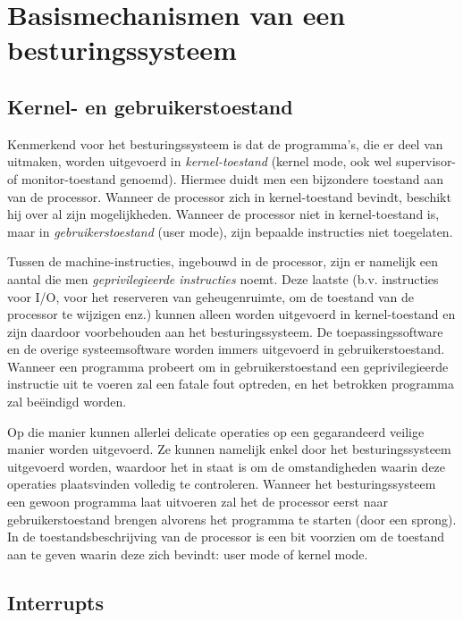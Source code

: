 \chapter{Basismechanismen van een besturingssysteem}

\section{Kernel- en gebruikerstoestand}

Kenmerkend voor het besturingssysteem is dat de programma's, die
er deel van uitmaken, worden uitgevoerd in
\emph{kernel-toestand} (kernel mode, ook wel supervisor-
of monitor-toestand genoemd). Hiermee duidt men een bijzondere toestand
aan van de processor. Wanneer de processor zich in kernel-toestand
bevindt, beschikt hij over al zijn mogelijkheden. Wanneer de processor
niet in kernel-toestand is, maar in
\emph{gebruikerstoestand} (user mode), zijn bepaalde
instructies niet toegelaten.

Tussen de machine-instructies, ingebouwd in de processor, zijn er
namelijk een aantal die men \emph{geprivilegieerde instructies}
noemt. Deze laatste (b.v. instructies voor I/O, voor het
reserveren van geheugenruimte, om de toestand van de processor te
wijzigen enz.) kunnen alleen worden uitgevoerd in kernel-toestand en
zijn daardoor voorbehouden aan het besturingssysteem. De
toepassingssoftware en de overige systeemsoftware worden immers
uitgevoerd in gebruikerstoestand. Wanneer een programma probeert om in
gebruikerstoestand een geprivilegieerde instructie uit te voeren zal een
fatale fout optreden, en het betrokken programma zal be\"eindigd
worden.

Op die manier kunnen allerlei delicate operaties op een
gegarandeerd veilige manier worden uitgevoerd. Ze kunnen namelijk enkel
door het besturingssysteem uitgevoerd worden, waardoor het in staat is
om de omstandigheden waarin deze operaties plaatsvinden volledig te
controleren. Wanneer het besturingssysteem een gewoon programma laat
uitvoeren zal het de processor eerst naar gebruikerstoestand brengen
alvorens het programma te starten (door een sprong). In de
toestandsbeschrijving van de processor is een bit voorzien om de
toestand aan te geven waarin deze zich bevindt: user mode of kernel
mode.

\section{Interrupts}

